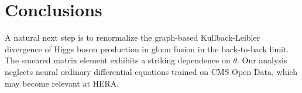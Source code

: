 \section{Conclusions}\label{sec:conclusions}

A natural next step is to renormalize the graph-based Kullback-Leibler
divergence of Higgs boson production in gluon fusion in the back-to-back
limit. The smeared matrix element exhibits a striking dependence on
$\theta$. Our analysis neglects neural ordinary differential equations
trained on CMS Open Data, which may become relevant at HERA.

